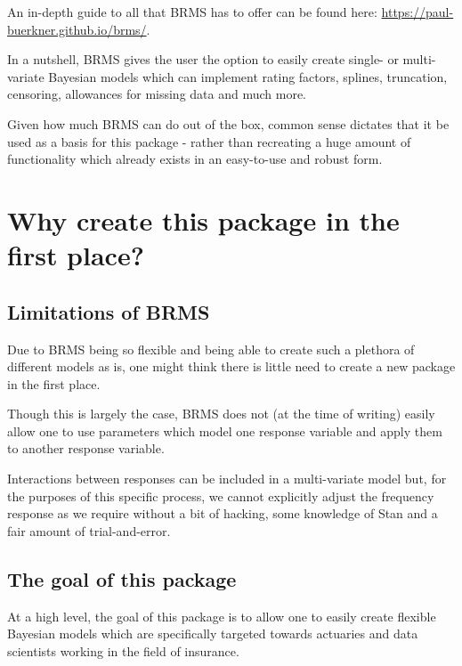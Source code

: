 \documentclass[
]{book}
\begin{document}
An in-depth guide to all that BRMS has to offer can be found here: \url{https://paul-buerkner.github.io/brms/}.

In a nutshell, BRMS gives the user the option to easily create single- or multi-variate Bayesian models which can implement rating factors, splines, truncation, censoring, allowances for missing data and much more.

Given how much BRMS can do out of the box, common sense dictates that it be used as a basis for this package - rather than recreating a huge amount of functionality which already exists in an easy-to-use and robust form.

\hypertarget{why-create-this-package-in-the-first-place}{%
\section{Why create this package in the first place?}\label{why-create-this-package-in-the-first-place}}

\hypertarget{limitations-of-brms}{%
\subsection{Limitations of BRMS}\label{limitations-of-brms}}

Due to BRMS being so flexible and being able to create such a plethora of different models as is, one might think there is little need to create a new package in the first place.

Though this is largely the case, BRMS does not (at the time of writing) easily allow one to use parameters which model one response variable and apply them to another response variable.

Interactions between responses can be included in a multi-variate model but, for the purposes of this specific process, we cannot explicitly adjust the frequency response as we require without a bit of hacking, some knowledge of Stan and a fair amount of trial-and-error.

\hypertarget{the-goal-of-this-package}{%
\subsection{The goal of this package}\label{the-goal-of-this-package}}

At a high level, the goal of this package is to allow one to easily create flexible Bayesian models which are specifically targeted towards actuaries and data scientists working in the field of insurance.
\end{document}
